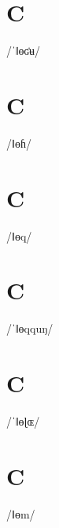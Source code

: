 \documentclass[10pt,a4paper,twoside]{book}
\begin{document}
\section*{C}

\begin{multicols}{3}
 {/ˈǁɵʛʉ/} {}
\end{multicols}

\section*{C}

\begin{multicols}{3}
 {/ǁɵɦ/} {}
\end{multicols}

\section*{C}

\begin{multicols}{3}
 {/ǁɵq/} {}
\end{multicols}

\section*{C}

\begin{multicols}{3}
 {/ˈǁɵqquŋ/} {}
\end{multicols}

\section*{C}

\begin{multicols}{3}
 {/ˈǁɵɭɶ/} {}
\end{multicols}

\section*{C}

\begin{multicols}{3}
 {/ǁɵm/} {}
\end{multicols}
\end{document}
